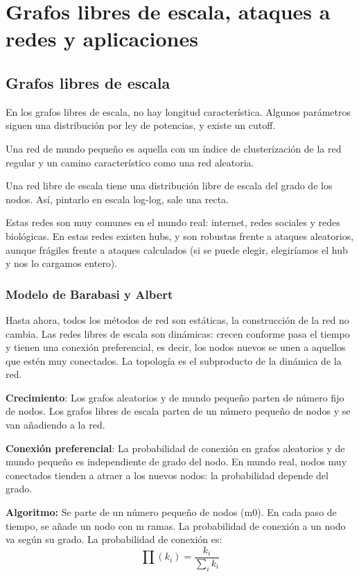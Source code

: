 \chapter{Grafos libres de escala, ataques a redes y aplicaciones}
\section{Grafos libres de escala}
En los grafos libres de escala, no hay longitud característica. Algunos parámetros siguen una distribución por ley de potencias, y existe un cutoff.

Una red de mundo pequeño es aquella con un índice de clusterización de la red regular y un camino característico como una red aleatoria. 

Una red libre de escala tiene una distribución libre de escala del grado de los nodos. Así, pintarlo en escala log-log, sale una recta.

Estas redes son muy comunes en el mundo real: internet, redes sociales y redes biológicas. En estas redes existen hubs, y son robustas frente a ataques aleatorios, aunque frágiles frente a ataques calculados (si se puede elegir, elegiríamos el hub y nos lo cargamos entero).

\subsection{Modelo de Barabasi y Albert} 
Hasta ahora, todos los métodos de red son estáticas, la construcción de la red no cambia. Las redes libres de escala son dinámicas: crecen conforme pasa el tiempo y tienen una conexión preferencial, es decir, los nodos nuevos se unen a aquellos que estén muy conectados. La topología es el subproducto de la dinámica de la red. 

\textbf{Crecimiento}: Los grafos aleatorios y de mundo pequeño parten de número fijo de nodos. Los grafos libres de escala parten de un número pequeño de nodos y se van añadiendo a la red.

\textbf{Conexión preferencial}: La probabilidad de conexión en grafos
aleatorios y de mundo pequeño
es independiente de grado del nodo. En mundo real, nodos muy conectados tienden a atraer a los nuevos nodos: la probabilidad depende del grado. 

\textbf{Algoritmo:}
Se parte de un número pequeño de nodos (m0). En cada paso de tiempo, se añade un nodo con m ramas. La probabilidad de conexión a un nodo va según su grado. La probabilidad de conexión es:
$$\prod(k_i) = \frac{k_i}{\sum_i k_i}$$

